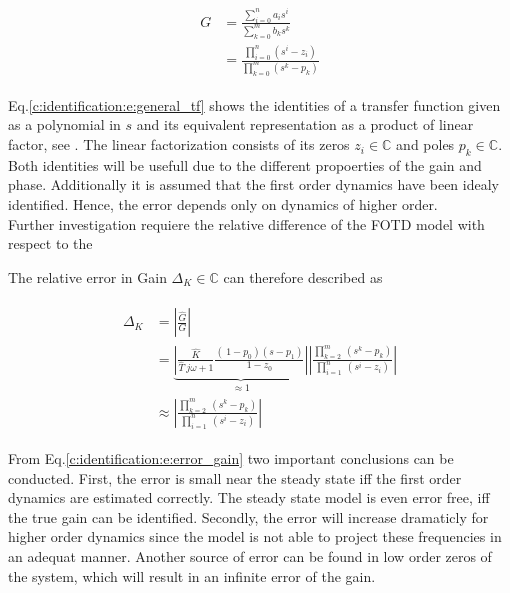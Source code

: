 \begin{align}
\begin{split}
G &=  \frac{\sum_{i=0}^n a_i s^i}{\sum_{k=0}^m b_k s^k} \\
&= \frac{\prod_{i=0}^n \left( s^i - z_i \right)}{\prod_{k=0}^m \left( s^k-p_k\right)} 
\end{split}
\label{c:identification:e:general_tf}
\end{align}

Eq.\ref{c:identification:e:general_tf} shows the identities of a transfer function given as a polynomial in $s$ and its equivalent representation as a product of linear factor, see \cite[p.269 ff.]{Lunze2016}. The linear factorization consists of its zeros $z_i \in \mathbb{C}$ and poles $p_k \in \mathbb{C}$. Both identities will be usefull due to the different propoerties of the gain and phase. Additionally it is assumed that the first order dynamics have been idealy identified. Hence, the error depends only on dynamics of higher order.\\

Further investigation requiere the relative difference of the FOTD model with respect to the

The relative error in Gain $\Delta_K \in \mathbb{C}$ can therefore described as

\begin{align}
\begin{split}
\Delta_K &= \left| \frac{\hat{G}}{G}\right| \\
&= \underbrace{\left|\frac{\hat{K}}{\hat{T}~j\omega+1} \frac{\left(\ 1-p_0 \right)\left( s- p_1 \right)}{1-z_0} \right|}_{\approx 1} \left| \frac{\prod_{k=2}^m~(s^k-p_k)}{\prod_{i=1}^n~(s^i-z_i)} \right| \\
&\approx \left| \frac{\prod_{k=2}^m~(s^k-p_k)}{\prod_{i=1}^n~(s^i-z_i)} \right|
\end{split}
\label{c:identification:e:error_gain}
\end{align}

From Eq.\ref{c:identification:e:error_gain} two important conclusions can be conducted. First, the error is small near the steady state iff the first order dynamics are estimated correctly. The steady state model is even error free, iff the true gain can be identified. Secondly, the error will increase dramaticly for higher order dynamics since the model is not able to project these frequencies in an adequat manner. Another source of error can be found in low order zeros of the system, which will result in an infinite error of the gain.\\

